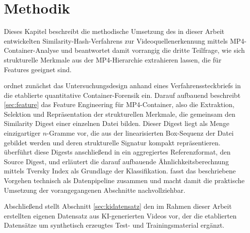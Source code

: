 \chapter{Methodik}

Dieses Kapitel beschreibt die methodische Umsetzung des in dieser Arbeit entwickelten Similarity-Hash-Verfahrens zur Videoquellenerkennung mittels MP4-Container-Analyse und beantwortet damit vorrangig die dritte Teilfrage, wie sich strukturelle Merkmale aus der MP4-Hierarchie extrahieren lassen, die für Features geeignet sind. 

 ordnet zunächst das Untersuchungsdesign anhand eines Verfahrenssteckbriefs in die etablierte quantitative Container-Forensik ein. Darauf aufbauend beschreibt \cref{sec:feature} das Feature Engineering für MP4-Container, also die Extraktion, Selektion und Repräsentation der strukturellen Merkmale, die gemeinsam den Similarity Digest einer einzelnen Datei bilden. Dieser Digest liegt als Menge einzigartiger \(n\)-Gramme vor, die aus der linearisierten Box-Sequenz der Datei gebildet werden und deren strukturelle Signatur kompakt repräsentieren.  überführt diese Digests anschließend in ein aggregiertes Referenzformat, den Source Digest, und erläutert die darauf aufbauende Ähnlichkeitsberechnung mittels Tversky Index als Grundlage der Klassifikation.  fasst das beschriebene Vorgehen technisch als Datenpipeline zusammen und macht damit die praktische Umsetzung der vorangegangenen Abschnitte nachvollziehbar.

Abschließend stellt Abschnitt \ref{sec:kidatensatz} den im Rahmen dieser Arbeit erstellten eigenen Datensatz aus KI-generierten Videos vor, der die etablierten Datensätze um synthetisch erzeugtes Test- und Trainingsmaterial ergänzt.





